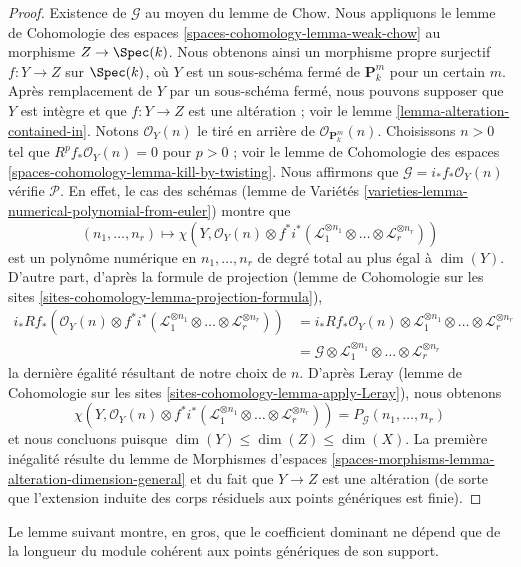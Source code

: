 \begin{proof}
\medskip\noindent
Existence de $\mathcal{G}$ au moyen du lemme de Chow. Nous appliquons le
lemme de Cohomologie des espaces \ref{spaces-cohomology-lemma-weak-chow}
au morphisme $Z \to \Spec(k)$. Nous obtenons ainsi un
morphisme propre surjectif $f : Y \to Z$ sur $\Spec(k)$,
où $Y$ est un sous-schéma fermé de $\mathbf{P}^m_k$ pour un certain $m$.
Après remplacement de $Y$ par un sous-schéma fermé, nous pouvons supposer que $Y$
est intègre et que $f : Y \to Z$ est une altération ; voir le
lemme \ref{lemma-alteration-contained-in}.
Notons $\mathcal{O}_Y(n)$ le tiré en arrière de $\mathcal{O}_{\mathbf{P}^m_k}(n)$.
Choisissons $n > 0$ tel que $R^pf_*\mathcal{O}_Y(n) = 0$
pour $p > 0$ ; voir le lemme de Cohomologie des espaces
\ref{spaces-cohomology-lemma-kill-by-twisting}.
Nous affirmons que $\mathcal{G} = i_*f_*\mathcal{O}_Y(n)$ vérifie $\mathcal{P}$.
En effet, le cas des schémas
(lemme de Variétés \ref{varieties-lemma-numerical-polynomial-from-euler})
montre que
$$
(n_1, \ldots, n_r)
\longmapsto
\chi(Y, \mathcal{O}_Y(n) \otimes
f^*i^*(\mathcal{L}_1^{\otimes n_1} \otimes \ldots \otimes
\mathcal{L}_r^{\otimes n_r}))
$$
est un polynôme numérique en $n_1, \ldots, n_r$ de degré total au
plus égal à $\dim(Y)$. D'autre part, d'après la formule de projection
(lemme de Cohomologie sur les sites \ref{sites-cohomology-lemma-projection-formula}),
\begin{align*}
i_*Rf_*\left(
\mathcal{O}_Y(n) \otimes
f^*i^*(\mathcal{L}_1^{\otimes n_1} \otimes \ldots \otimes
\mathcal{L}_r^{\otimes n_r})\right)
& =
i_*Rf_*\mathcal{O}_Y(n) \otimes
\mathcal{L}_1^{\otimes n_1} \otimes \ldots \otimes
\mathcal{L}_r^{\otimes n_r} \\
& =
\mathcal{G} \otimes \mathcal{L}_1^{\otimes n_1} \otimes \ldots \otimes
\mathcal{L}_r^{\otimes n_r}
\end{align*}
la dernière égalité résultant de notre choix de $n$. D'après
Leray (lemme de Cohomologie sur les sites \ref{sites-cohomology-lemma-apply-Leray}),
nous obtenons
$$
\chi(Y, \mathcal{O}_Y(n) \otimes
f^*i^*(\mathcal{L}_1^{\otimes n_1} \otimes \ldots \otimes
\mathcal{L}_r^{\otimes n_r})) =
P_\mathcal{G}(n_1, \ldots, n_r)
$$
et nous concluons puisque $\dim(Y) \leq \dim(Z) \leq \dim(X)$.
La première inégalité résulte du
lemme de Morphismes d'espaces
\ref{spaces-morphisms-lemma-alteration-dimension-general}
et du fait que $Y \to Z$ est une altération (de sorte que
l'extension induite des corps résiduels aux points génériques est finie).
\end{proof}

\noindent
Le lemme suivant montre, en gros, que le coefficient dominant ne dépend que
de la longueur du module cohérent aux points génériques de son
support.

